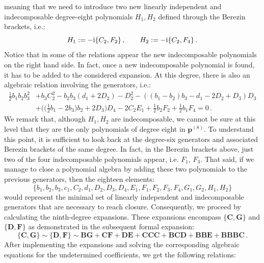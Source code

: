 \documentclass[10pt]{amsart}
\theoremstyle{definition}
\theoremstyle{corollary}
\theoremstyle{remark}
\theoremstyle{conclusion}
\begin{document}
meaning that we need to introduce two new linearly independent and indecomposable degree-eight polynomials $H_1, H_2$ defined through the Berezin brackets, i.e.:
\begin{equation}
H_1:=-{\rm i}\{C_2, F_2\} \, , \qquad H_2:=-{\rm i}\{C_2, F_4\} \, .
\end{equation}
Notice that in some of the relations appear the new indecomposable polynomials on the right hand side. In fact, once a new indecomposable polynomial is found, it has to be added to the considered expansion. At this degree, there is also an algebraic relation involving the generators, i.e.:
\begin{align}
\frac{1}{2}b_1 b_2 b_3^2&+b_3 C_2^2-b_2 b_3(d_1+2D_2)-D_2^2-((b_1-b_2)b_3-d_1-2D_2+D_3)D_3 \nonumber \\
&+\bigl(\bigl(\frac{1}{2}b_1-2b_3\bigl)b_2+2D_3\bigl)D_4-2 C_2 E_1+\frac{1}{2}b_2 F_2+\frac{1}{2}b_1 F_4=0 \, .
\end{align}
 We remark that, although $H_1, H_2$ are indecomposable,  we cannot be sure at this level that they are the only polynomials of degree eight in $\boldsymbol{p}^{(8)}$. To understand this point, it is sufficient to look back at the degree-six generators and associated Berezin brackets of the same degree. In fact, in the Berezin brackets above, just two of the four indecomposable polynomials appear, i.e. $F_1$, $F_3$. That said, if we manage to close a polynomial algebra by adding these two polynomials to the previous generators, then the eighteen elements:
\begin{equation}
\{b_1, b_2, b_3, c_1, C_2, d_1, D_2, D_3, D_4, E_1, F_1, F_2, F_3, F_4, G_1, G_2, H_1, H_2\} 
\label{generators}
\end{equation}
would represent the minimal set of linearly independent and indecomposable generators that are necessary to reach closure. Consequently, we proceed by calculating the ninth-degree expansions. These expansions encompass $\{\mathbf{C},\mathbf{G} \}$ and $\{\mathbf{D},\mathbf{F} \}$ as demonstrated in the subsequent formal expansion:
\begin{equation}
\{\mathbf{C}, \mathbf{G}\} \sim \{\mathbf{D}, \mathbf{F}\}\sim  \mathbf{B} \mathbf{G}+ \mathbf{C} \mathbf{F}+ \mathbf{D} \mathbf{E}+ \mathbf{C} \mathbf{C} \mathbf{C}+ \mathbf{B} \mathbf{C} \mathbf{D}+\mathbf{B} \mathbf{B} \mathbf{E}+ \mathbf{B} \mathbf{B} \mathbf{B} \mathbf{C}\,  .
\label{deg9}
\end{equation}
After implementing the expansions and solving the corresponding algebraic equations for the undetermined coefficients, we get the following relations:
\end{document}
